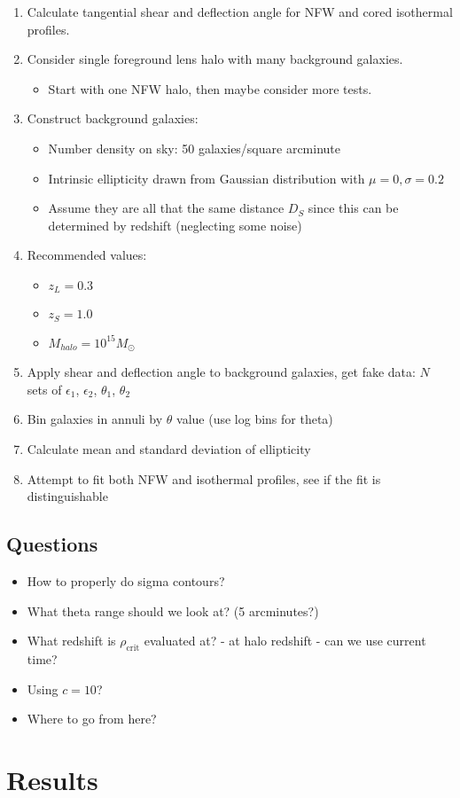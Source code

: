 \documentclass[10pt]{article}
\begin{document}
\begin{enumerate}
    \item Calculate tangential shear and deflection angle for NFW and cored isothermal profiles.
    \item Consider single foreground lens halo with many background galaxies.
    \begin{itemize}
        \item Start with one NFW halo, then maybe consider more tests.
    \end{itemize}
    \item Construct background galaxies:
    \begin{itemize}
        \item Number density on sky: 50 galaxies/square arcminute
        \item Intrinsic ellipticity drawn from Gaussian distribution with $\mu=0, \sigma=0.2$
        \item Assume they are all that the same distance $D_S$ since this can be determined by redshift (neglecting some noise)
    \end{itemize}
    \item Recommended values:
    \begin{itemize}
        \item $z_L = 0.3$
        \item $z_S = 1.0$
        \item $M_{halo} = 10^{15} M_\odot$
    \end{itemize}
    \item Apply shear and deflection angle to background galaxies, get fake data: $N$ sets of $\epsilon_1$, $\epsilon_2$, $\theta_1$, $\theta_2$
    \item Bin galaxies in annuli by $\theta$ value (use log bins for theta)
    \item Calculate mean and standard deviation of ellipticity
    \item Attempt to fit both NFW and isothermal profiles, see if the fit is distinguishable
\end{enumerate}


\subsection{Questions}
\begin{itemize}
    \item How to properly do sigma contours?
    \item What theta range should we look at? (5 arcminutes?)
    \item What redshift is $\rho_\mathrm{crit}$ evaluated at? - at halo redshift - can we use current time?
    \item Using $c = 10$?
    \item Where to go from here?
\end{itemize}


\section{Results}





\end{document}
